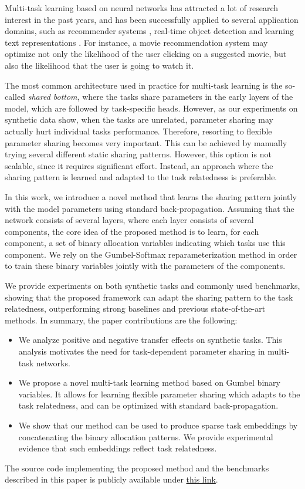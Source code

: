 \documentclass[conference]{IEEEtran}
\begin{document}
Multi-task learning \cite{Caruana-1998, Caruana-1993} based on neural networks has attracted a lot of research interest in the past years, and has been successfully applied to several application domains, such as recommender systems \cite{BaBeCa-2016}, real-time object detection \cite{Fast-R-CNN} and learning text representations \cite{DBLP:journals/corr/abs-1907-04829,DBLP:journals/corr/abs-1907-12412}.
For instance, a movie recommendation system may optimize not only the likelihood of the user clicking on a suggested movie, but also the likelihood that the user is going to watch it.

The most common architecture used in practice for multi-task learning is the so-called \textit{shared bottom}, where the tasks share parameters in the early layers of the model, which are followed by task-specific heads.
However, as our experiments on synthetic data show, when the tasks are unrelated, parameter sharing may actually hurt individual tasks performance. Therefore, resorting to flexible parameter sharing becomes very important. This can be achieved by manually trying several different static sharing patterns. However, this option is not scalable, since it requires significant effort. Instead, an approach where the sharing pattern is learned and adapted to the task relatedness is preferable. 

In this work, we introduce a novel method that learns the sharing pattern jointly with the model parameters using standard back-propagation.
Assuming that the network consists of several layers, where each layer consists of several components, the core idea of the proposed method is to learn, for each component, a set of binary allocation variables indicating which tasks use this component.
We rely on the Gumbel-Softmax reparameterization method \cite{JangGuPoole.2017} in order to train these binary variables jointly with the parameters of the components.

We provide experiments on both synthetic tasks and commonly used benchmarks, showing that the proposed framework can adapt the sharing pattern to the task relatedness, outperforming strong baselines and previous state-of-the-art methods. In summary, the paper contributions are the following:
\begin{itemize}
    \item We analyze positive and negative transfer effects on synthetic tasks. This analysis motivates the need for task-dependent parameter sharing in multi-task networks.
    \item We propose a novel multi-task learning method based on Gumbel binary variables. It allows for learning flexible parameter sharing which adapts to the task relatedness, and can be optimized with standard back-propagation.
    \item We show that our method can be used to produce sparse task embeddings by concatenating the binary allocation patterns. We provide experimental evidence that such embeddings reflect task relatedness.
\end{itemize}
The source code implementing the proposed method and the benchmarks described in this paper is publicly available under \href{https://drive.google.com/open?id=1vrXONNr_SBzQw81gZlqsWMslkFmzy2HK}{this link}.
\end{document}
